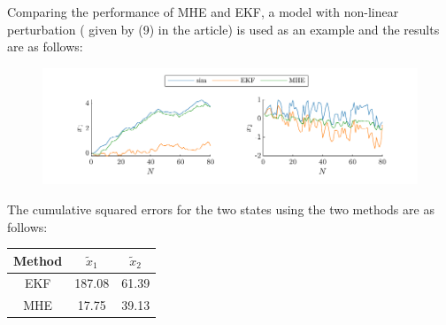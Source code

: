 


\clearpage
Comparing the performance of MHE and EKF, a model with non-linear perturbation ( given by (9) in the article) is used as an example and the results are as follows: 
\begin{figure}[!h]
    \centering
    \includegraphics{figures/ex5_MHE_EKF.pdf}
\end{figure}

The cumulative squared errors for the two states using the two methods are as follows:
\begin{table}[!h]
    \centering
    \begin{tabular}{c|c|c}
        Method & $\tilde x_1$ & $\tilde x_2$ \\
        \hline 
        EKF & 187.08 & 61.39 \\
        MHE & 17.75 & 39.13
    \end{tabular}
\end{table}

